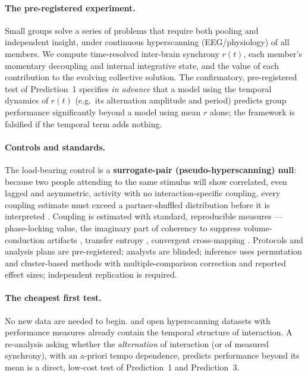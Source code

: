 \documentclass[11pt]{article}
\begin{document}
\paragraph{The pre-registered experiment.} Small groups solve a series of problems that require both pooling and independent insight, under continuous hyperscanning (EEG/physiology) of all members. We compute time-resolved inter-brain synchrony $r(t)$, each member's momentary decoupling and internal integrative state, and the value of each contribution to the evolving collective solution. The confirmatory, pre-registered test of Prediction~1 specifies \emph{in advance} that a model using the temporal dynamics of $r(t)$ (e.g.\ its alternation amplitude and period) predicts group performance significantly beyond a model using mean $r$ alone; the framework is falsified if the temporal term adds nothing.

\paragraph{Controls and standards.} The load-bearing control is a \textbf{surrogate-pair (pseudo-hyperscanning) null}: because two people attending to the same stimulus will show correlated, even lagged and asymmetric, activity with no interaction-specific coupling, every coupling estimate must exceed a partner-shuffled distribution before it is interpreted \citep{burgess2013conceptual, novembre2021hyperscanning, hamilton2021hyperscanning}. Coupling is estimated with standard, reproducible measures --- phase-locking value, the imaginary part of coherency to suppress volume-conduction artifacts \citep{nolte2004identifying}, transfer entropy \citep{schreiber2000measuring}, convergent cross-mapping \citep{sugihara2012detecting}. Protocols and analysis plans are pre-registered; analysts are blinded; inference uses permutation and cluster-based methods with multiple-comparison correction and reported effect sizes; independent replication is required.

\paragraph{The cheapest first test.} No new data are needed to begin. \citet{bernstein2018intermittent} and open hyperscanning datasets with performance measures \citep{dikker2017brain} already contain the temporal structure of interaction. A re-analysis asking whether the \emph{alternation} of interaction (or of measured synchrony), with an a-priori tempo dependence, predicts performance beyond its mean is a direct, low-cost test of Prediction~1 and Prediction~3.
\end{document}
